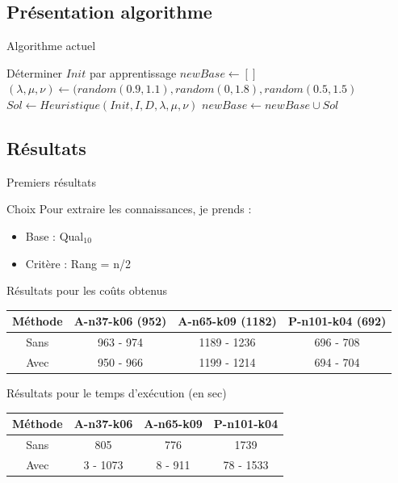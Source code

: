 \documentclass{beamer}
\begin{document}
\subsection{Présentation algorithme}
\begin{frame}{Algorithme actuel}

\begin{algorithm}[H]
\DontPrintSemicolon %
Déterminer $Init$ par apprentissage\;
$newBase \gets []$\;
 {
	$(\lambda,\mu,\nu) \gets (random(0.9,1.1),random(0,1.8),random(0.5,1.5)$\;
	 {
		$Sol \gets Heuristique(Init,I,D,\lambda,\mu,\nu)$\;
		$newBase \gets newBase \cup Sol$\;
	}
}
\;

\end{algorithm}

\end{frame}

\subsection{Résultats}

\begin{frame}{Premiers résultats}
\begin{block}{Choix}
Pour extraire les connaissances, je prends :
\begin{itemize}
\item Base : Qual$_{10}$
\item Critère : Rang = n/2
\end{itemize}
\end{block}

Résultats pour les coûts obtenus
\begin{tabular}{|c|c|c|c|}
   \hline
   Méthode  & A-n37-k06 (952) & A-n65-k09 (1182) & P-n101-k04 (692)  \\
   \hline
   Sans & 963 - 974  & 1189 - 1236 & 696 - 708   \\
   \hline
   Avec & 950 - 966 & 1199 - 1214 & 694 - 704  \\
   \hline
\end{tabular}

Résultats pour le temps d'exécution (en sec)
\begin{tabular}{|c|c|c|c|}
   \hline
   Méthode  & A-n37-k06 & A-n65-k09 & P-n101-k04  \\
   \hline
   Sans & 805  & 776 &  1739  \\
   \hline
   Avec & 3 - 1073 & 8 - 911 & 78 - 1533  \\
   \hline
\end{tabular}

\end{frame}
\end{document}
